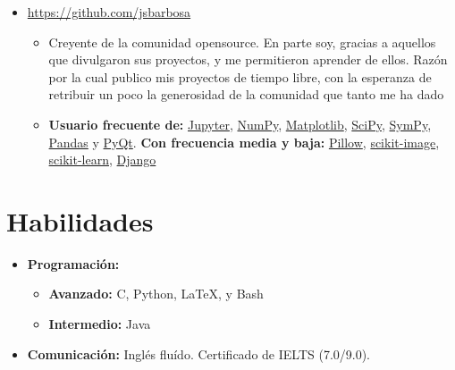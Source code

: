 \documentclass[11pt, letterpaper, sans]{moderncv}        %
\begin{document}
\begin{itemize}
		\item{
			{
				\url{https://github.com/jsbarbosa}
				\vspace{3pt}
				\begin{itemize}
					\item Creyente de la comunidad opensource. En parte soy, gracias a aquellos que divulgaron sus proyectos, y me permitieron aprender de ellos. Razón por la cual publico mis proyectos de tiempo libre, con la esperanza de retribuir un poco la generosidad de la comunidad que tanto me ha dado
					\item \textbf{Usuario frecuente de:}
					\href{https://jupyter.org/}{Jupyter}, \href{https://www.numpy.org/}{NumPy}, \href{https://www.matplotlib.com}{Matplotlib}, \href{https://www.scipy.org/}{SciPy}, \href{https://www.sympy.org/en/index.html}{SymPy}, \href{https://pandas.pydata.org/}{Pandas} y \href{https://www.qt.io/}{PyQt}. \textbf{Con frecuencia media y baja:} \href{https://python-pillow.org/}{Pillow}, \href{https://scikit-image.org/}{scikit-image}, \href{https://scikit-learn.org/stable/}{scikit-learn}, \href{https://www.djangoproject.com/}{Django}
				\end{itemize}
			}
		}
	\end{itemize}

\section{Habilidades}
\vspace{6pt}

\begin{itemize}
	\item \textbf{Programación:}
	\begin{itemize}
		\item \textbf{Avanzado:} C, Python, \LaTeX, y Bash
		\item \textbf{Intermedio:} Java
	\end{itemize} 	
	\vspace{6pt}
	\item \textbf{Comunicación:} Inglés flu\'ido. Certificado de IELTS (7.0/9.0).
\end{itemize}

\vfill
\enlargethispage{\footskip}
\end{document}
